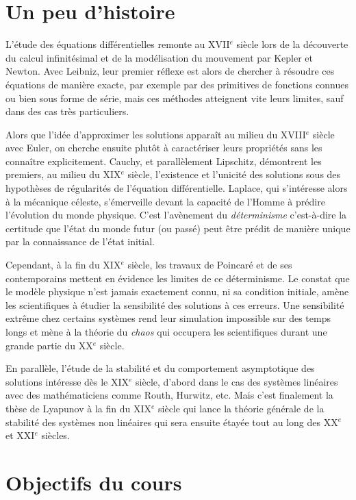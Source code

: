 \hypertarget{un-peu-dhistoire}{%
\chapter{Un peu d'histoire}\label{un-peu-dhistoire}}

L'étude des équations différentielles remonte au XVII\(^e\) siècle lors
de la découverte du calcul infinitésimal et de la modélisation du
mouvement par Kepler et Newton. Avec Leibniz, leur premier réflexe est
alors de chercher à résoudre ces équations de manière exacte, par
exemple par des primitives de fonctions connues ou bien sous forme de
série, mais ces méthodes atteignent vite leurs limites, sauf dans des
cas très particuliers.

Alors que l'idée d'approximer les solutions apparaît au milieu du
XVIII\(^e\) siècle avec Euler, on cherche ensuite plutôt à caractériser
leurs propriétés sans les connaître explicitement. Cauchy, et
parallèlement Lipschitz, démontrent les premiers, au milieu du XIX\(^e\)
siècle, l'existence et l'unicité des solutions sous des hypothèses de
régularités de l'équation différentielle. Laplace, qui s'intéresse alors
à la mécanique céleste, s'émerveille devant la capacité de l'Homme à
prédire l'évolution du monde physique. C'est l'avènement du
\emph{déterminisme} c'est-à-dire la certitude que l'état du monde futur
(ou passé) peut être prédit de manière unique par la connaissance de
l'état initial.

Cependant, à la fin du XIX\(^e\) siècle, les travaux de Poincaré et de
ses contemporains mettent en évidence les limites de ce déterminisme. Le
constat que le modèle physique n'est jamais exactement connu, ni sa
condition initiale, amène les scientifiques à étudier la sensibilité des
solutions à ces erreurs. Une sensibilité extrême chez certains systèmes
rend leur simulation impossible sur des temps longs et mène à la théorie
du \emph{chaos} qui occupera les scientifiques durant une grande partie
du XX\(^e\) siècle.

En parallèle, l'étude de la stabilité et du comportement asymptotique
des solutions intéresse dès le XIX\(^e\) siècle, d'abord dans le cas des
systèmes linéaires avec des mathématiciens comme Routh, Hurwitz, etc.
Mais c'est finalement la thèse de Lyapunov à la fin du XIX\(^e\) siècle
qui lance la théorie générale de la stabilité des systèmes non linéaires
qui sera ensuite étayée tout au long des XX\(^e\) et XXI\(^e\) siècles.

\hypertarget{objectifs-du-cours}{%
\chapter{Objectifs du cours}\label{objectifs-du-cours}}

